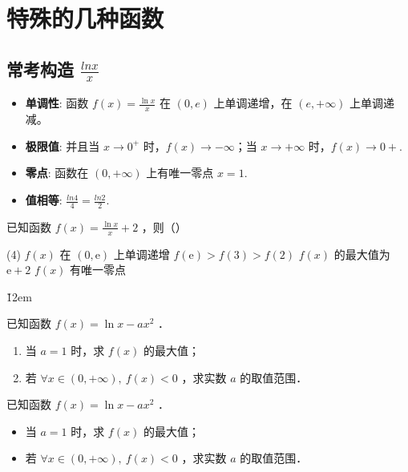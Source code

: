 \section{特殊的几种函数}

\subsection{常考构造 $\frac{lnx}{x}$}

\begin{theorem}
    \begin{itemize}
        \item \textbf{单调性}: 函数 $f(x) = \frac{\ln x}{x}$ 在 $(0, e)$ 上单调递增，在 $(e, +\infty)$ 上单调递减。
        \item \textbf{极限值}: 并且当 $x \to 0^+$ 时，$f(x) \to -\infty$；当 $x \to +\infty$ 时，$f(x) \to 0+$.
        \item \textbf{零点}: 函数在 $(0, +\infty)$ 上有唯一零点 $x = 1$.
        \item \textbf{值相等}: $\frac{ln4}{4} = \frac{ln2}{2}$.
    \end{itemize}
\end{theorem}

\begin{example}
    已知函数 $f(x)=\frac{\ln x}{x}+2$ ，则（\quad）
    \begin{tasks}(4)
        \task $f(x)$ 在 $(0, \mathrm{e})$ 上单调递增
        \task $f(\mathrm{e})>f(3)>f(2)$
        \task $f(x)$ 的最大值为 $\mathrm{e}+2$
        \task $f(x)$ 有唯一零点
    \end{tasks}
\end{example}

\v{12em}

\begin{example}
    已知函数 $f(x)=\ln x-a x^2$ ．
    \begin{enumerate}
        \item 当 $a=1$ 时，求 $f(x)$ 的最大值；

        \item 若 $\forall x \in(0,+\infty), ~ f(x)<0$ ，求实数 $a$ 的取值范围．
    \end{enumerate}
\end{example}

\begin{example}
    已知函数 $f(x)=\ln x-a x^2$ ．
    \begin{itemize}
        \item 当 $a=1$ 时，求 $f(x)$ 的最大值；
        \item 若 $\forall x \in(0,+\infty), ~ f(x)<0$ ，求实数 $a$ 的取值范围．
    \end{itemize}
\end{example}

